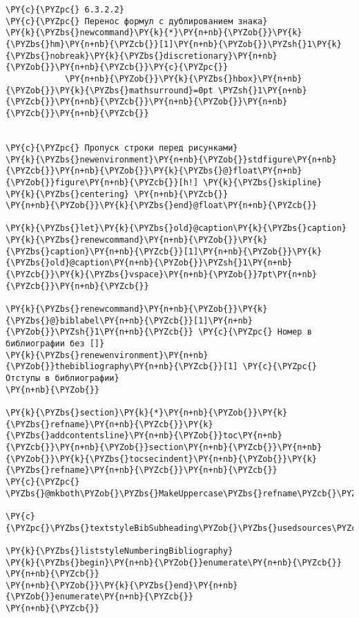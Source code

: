 \begin{Verbatim}[commandchars=\\\{\}]
\PY{c}{\PYZpc{} 6.3.2.2}
\PY{c}{\PYZpc{} Перенос формул с дублированием знака}
\PY{k}{\PYZbs{}newcommand}\PY{k}{*}\PY{n+nb}{\PYZob{}}\PY{k}{\PYZbs{}hm}\PY{n+nb}{\PYZcb{}}[1]\PY{n+nb}{\PYZob{}}\PYZsh{}1\PY{k}{\PYZbs{}nobreak}\PY{k}{\PYZbs{}discretionary}\PY{n+nb}{\PYZob{}}\PY{n+nb}{\PYZcb{}}\PY{c}{\PYZpc{}}
            \PY{n+nb}{\PYZob{}}\PY{k}{\PYZbs{}hbox}\PY{n+nb}{\PYZob{}}\PY{k}{\PYZbs{}mathsurround}=0pt \PYZsh{}1\PY{n+nb}{\PYZcb{}}\PY{n+nb}{\PYZcb{}}\PY{n+nb}{\PYZob{}}\PY{n+nb}{\PYZcb{}}\PY{n+nb}{\PYZcb{}}


\PY{c}{\PYZpc{} Пропуск строки перед рисунками}
\PY{k}{\PYZbs{}newenvironment}\PY{n+nb}{\PYZob{}}stdfigure\PY{n+nb}{\PYZcb{}}\PY{n+nb}{\PYZob{}}\PY{k}{\PYZbs{}@}float\PY{n+nb}{\PYZob{}}figure\PY{n+nb}{\PYZcb{}}[h!] \PY{k}{\PYZbs{}skipline} \PY{k}{\PYZbs{}centering} \PY{n+nb}{\PYZcb{}}
\PY{n+nb}{\PYZob{}}\PY{k}{\PYZbs{}end}@float\PY{n+nb}{\PYZcb{}}

\PY{k}{\PYZbs{}let}\PY{k}{\PYZbs{}old}@caption\PY{k}{\PYZbs{}caption}
\PY{k}{\PYZbs{}renewcommand}\PY{n+nb}{\PYZob{}}\PY{k}{\PYZbs{}caption}\PY{n+nb}{\PYZcb{}}[1]\PY{n+nb}{\PYZob{}}\PY{k}{\PYZbs{}old}@caption\PY{n+nb}{\PYZob{}}\PYZsh{}1\PY{n+nb}{\PYZcb{}}\PY{k}{\PYZbs{}vspace}\PY{n+nb}{\PYZob{}}7pt\PY{n+nb}{\PYZcb{}}\PY{n+nb}{\PYZcb{}}

\PY{k}{\PYZbs{}renewcommand}\PY{n+nb}{\PYZob{}}\PY{k}{\PYZbs{}@}biblabel\PY{n+nb}{\PYZcb{}}[1]\PY{n+nb}{\PYZob{}}\PYZsh{}1\PY{n+nb}{\PYZcb{}} \PY{c}{\PYZpc{} Номер в библиографии без []}
\PY{k}{\PYZbs{}renewenvironment}\PY{n+nb}{\PYZob{}}thebibliography\PY{n+nb}{\PYZcb{}}[1] \PY{c}{\PYZpc{} Отступы в библиографии}
\PY{n+nb}{\PYZob{}}

\PY{k}{\PYZbs{}section}\PY{k}{*}\PY{n+nb}{\PYZob{}}\PY{k}{\PYZbs{}refname}\PY{n+nb}{\PYZcb{}}\PY{k}{\PYZbs{}addcontentsline}\PY{n+nb}{\PYZob{}}toc\PY{n+nb}{\PYZcb{}}\PY{n+nb}{\PYZob{}}section\PY{n+nb}{\PYZcb{}}\PY{n+nb}{\PYZob{}}\PY{k}{\PYZbs{}tocsecindent}\PY{n+nb}{\PYZob{}}\PY{k}{\PYZbs{}refname}\PY{n+nb}{\PYZcb{}}\PY{n+nb}{\PYZcb{}}
\PY{c}{\PYZpc{}     \PYZbs{}@mkboth\PYZob{}\PYZbs{}MakeUppercase\PYZbs{}refname\PYZcb{}\PYZob{}\PYZbs{}MakeUppercase\PYZbs{}refname\PYZcb{}\PYZpc{}}

\PY{c}{\PYZpc{}\PYZbs{}textstyleBibSubheading\PYZob{}\PYZbs{}usedsources\PYZcb{}}

\PY{k}{\PYZbs{}liststyleNumberingBibliography}
\PY{k}{\PYZbs{}begin}\PY{n+nb}{\PYZob{}}enumerate\PY{n+nb}{\PYZcb{}}
\PY{n+nb}{\PYZcb{}}
\PY{n+nb}{\PYZob{}}\PY{k}{\PYZbs{}end}\PY{n+nb}{\PYZob{}}enumerate\PY{n+nb}{\PYZcb{}}
\PY{n+nb}{\PYZcb{}}



\end{Verbatim}
